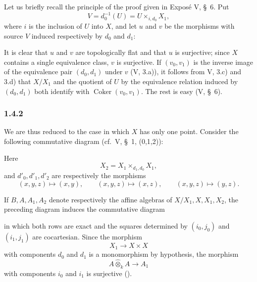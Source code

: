 Let us briefly recall the principle of the proof given in
Expos\'e V, \S~6. Put
\[
  V=d_0^{-1}(U)=U\times_{i,d_0}X_1,
\]
where \(i\) is the inclusion of \(U\) into \(X\), and let \(u\) and
\(v\) be the morphisms with source \(V\) induced respectively by
\(d_0\) and \(d_1\):
\begin{center}
  \label{sga3:VIIB:1.4.1:quasisection-span}
  
\end{center}
It is clear that \(u\) and \(v\) are topologically flat and that
\(u\) is surjective; since \(X\) contains a single equivalence class,
\(v\) is surjective. If \((v_0,v_1)\) is the inverse image of the
equivalence pair \((d_0,d_1)\) under \(v\) \textup{(V, 3.a))},
it follows from V, 3.c) and 3.d) that \(X/X_1\) and the quotient of
\(U\) by the equivalence relation induced by \((d_0,d_1)\) both
identify with \(\operatorname{Coker}(v_0,v_1)\). The rest is easy
(V, \S~6).

\subsubsection*{1.4.2}
\label{sga3:VIIB:1.4.2}

We are thus reduced to the case in which \(X\) has only one
point.
Consider the following commutative diagram
\textup{(cf.\ V, \S~1, \textup{(0,1,2)})}:
\begin{center}
  \label{sga3:VIIB:1.4.2:equivalence-groupoid-diagram}
  
\end{center}
Here
\[
  X_2=X_1\times_{d_1,d_0}X_1,
\]
and \(d'_0,d'_1,d'_2\) are respectively the
morphisms
\[
  (x,y,z)\longmapsto(x,y),\qquad
  (x,y,z)\longmapsto(x,z),\qquad
  (x,y,z)\longmapsto(y,z).
\]

If \(B,A,A_1,A_2\) denote respectively the affine algebras of
\(X/X_1,X,X_1,X_2\), the preceding diagram induces the commutative
diagram
\begin{center}
  \label{sga3:VIIB:1.4.2:affine-algebra-diagram}
  
\end{center}
in which both rows are exact and the squares determined by
\((i_0,j_0)\) and \((i_1,j_1)\) are cocartesian. Since the morphism
\[
  X_1\longrightarrow X\times X
\]
with components \(d_0\) and \(d_1\) is a monomorphism by hypothesis,
the morphism
\[
  A\widehat{\otimes}_k A\longrightarrow A_1
\]
with components \(i_0\) and \(i_1\) is surjective
().

